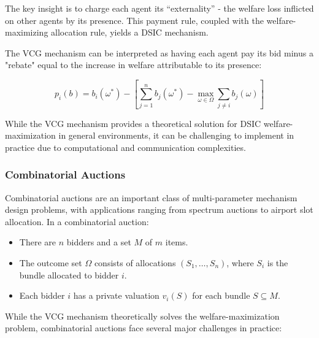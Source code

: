 \documentclass[
  letterpaper,
  numbers=noenddot,
  DIV=11,
  oneside]{scrreprt}
\theoremstyle{remark}
\begin{document}
The key insight is to charge each agent its ``externality'' - the
welfare loss inflicted on other agents by its presence. This payment
rule, coupled with the welfare-maximizing allocation rule, yields a DSIC
mechanism.

The VCG mechanism can be interpreted as having each agent pay its bid
minus a "rebate" equal to the increase in welfare attributable to its
presence:

\[p_i(b) = b_i(\omega^*) - \left[ \sum_{j=1}^n b_j(\omega^*) - \max_{\omega \in \Omega} \sum_{j \neq i} b_j(\omega) \right]\]

While the VCG mechanism provides a theoretical solution for DSIC
welfare-maximization in general environments, it can be challenging to
implement in practice due to computational and communication
complexities.

\subsubsection*{Combinatorial Auctions}\label{combinatorial-auctions}

Combinatorial auctions are an important class of multi-parameter
mechanism design problems, with applications ranging from spectrum
auctions to airport slot allocation. In a combinatorial auction:

\begin{itemize}
\item
  There are \(n\) bidders and a set \(M\) of \(m\) items.
\item
  The outcome set \(\Omega\) consists of allocations
  \((S_1, \ldots, S_n)\), where \(S_i\) is the bundle allocated to
  bidder \(i\).
\item
  Each bidder \(i\) has a private valuation \(v_i(S)\) for each bundle
  \(S \subseteq M\).
\end{itemize}

While the VCG mechanism theoretically solves the welfare-maximization
problem, combinatorial auctions face several major challenges in
practice:
\end{document}
